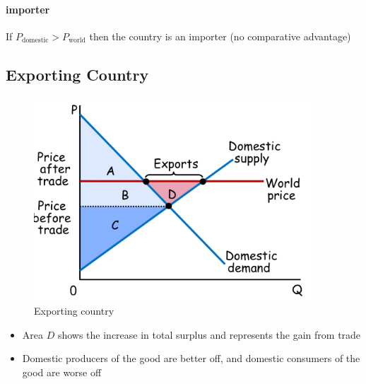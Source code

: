 \documentclass[a4paper,titlepage] {scrartcl}
\begin{document}
\paragraph{importer} %
\label{par:importer}
If $P_{\text{domestic}}>P_{\text{world}}$ then the country is an importer (no comparative advantage)


\subsection{Exporting Country} %
\label{sub:exporting_country}
	\begin{figure}[htbp]
		\centering
			\includegraphics[height=3in]{images/exportCountry.png}
		\caption{Exporting country}
		\label{fig:images_exportCountry}
	\end{figure}
	
\begin{itemize}
	\item Area $D$ shows the increase in total surplus and represents the gain from trade
	\item Domestic producers of the good are better off, and domestic consumers of the good are worse off
\end{itemize}
	
\end{document}
